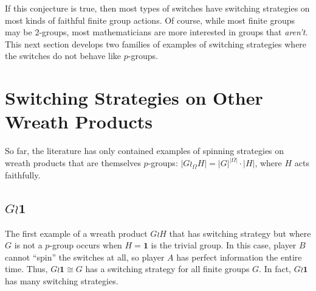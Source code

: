 If this conjecture is true, then most types of switches have switching
strategies on most kinds of faithful finite group actions.
Of course, while most finite groups may be $2$-groups, most mathematicians
are more interested in groups that \textit{aren't}.
This next section develops two families of examples of switching strategies
where the switches do not behave like $p$-groups.

%
%
\section{Switching Strategies on Other Wreath Products}
\label{sec:OtherSwitchingStrategies}

So far, the literature has only contained examples of spinning strategies on
wreath products that are themselves $p$-groups:
$|G \wr_\Omega H| = |G|^{|\Omega|} \cdot |H|$, where $H$ acts faithfully.

\subsection{\texorpdfstring{$G \wr \mathbf{1}$}{The trivial wreath product}}

The first example of a wreath product $G \wr H$ that has switching strategy
but where $G$ is not a $p$-group occurs when
$H = \textbf{1}$ is the trivial group.
In this case, player $B$ cannot ``spin'' the switches at all, so player $A$ has
perfect information the entire time.
Thus, $G \wr \mathbf{1} \cong G$ has a switching strategy for all finite groups
$G$. In fact, $G \wr \mathbf{1}$ has many switching strategies.

